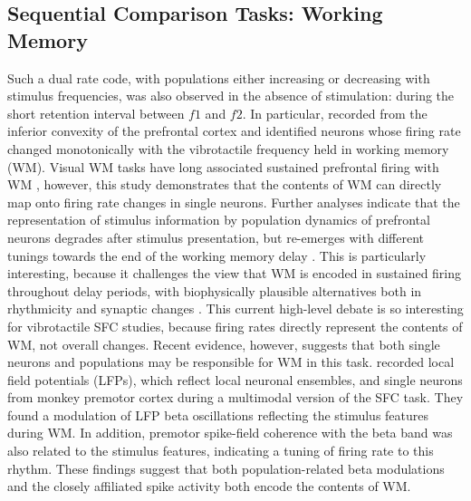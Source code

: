 \subsection{Sequential Comparison Tasks: Working Memory}
Such a dual rate code, with populations either increasing or decreasing with stimulus frequencies, was also observed in the absence of stimulation: during the short retention interval between $f1$ and $f2$. In particular, \textcite{Romo1999} recorded from the inferior convexity of the prefrontal cortex and identified neurons whose firing rate changed monotonically with the vibrotactile frequency held in working memory (WM). Visual WM tasks have long associated sustained prefrontal firing with WM \parencite{Funahashi1989,Fuster1971,Goldman-Rakic1995}, however, this study demonstrates that the contents of WM can directly map onto firing rate changes in single neurons. Further analyses indicate that the representation of stimulus information by population dynamics of prefrontal neurons degrades after stimulus presentation, but re-emerges with different tunings towards the end of the working memory delay \parencite{Barak2010}. This is particularly interesting, because it challenges the view that WM is encoded in sustained firing throughout delay periods, with biophysically plausible alternatives both in rhythmicity \parencite{Fiebig2017,Lundqvist2018a,Lundqvist2016} and synaptic changes \parencite{Mongillo2008,Stokes2015}. This current high-level debate \parencite[for either side, see:][]{Constantinidis2018,Lundqvist2018} is so interesting for vibrotactile SFC studies, because firing rates directly represent the contents of WM, not overall changes. Recent evidence, however, suggests that both single neurons and populations may be responsible for WM in this task. \textcite{Haegens2017} recorded local field potentials (LFPs), which reflect local neuronal ensembles, and single neurons from monkey premotor cortex during a multimodal version of the SFC task. They found a modulation of LFP beta oscillations reflecting the stimulus features during WM. In addition, premotor spike-field coherence with the beta band was also related to the stimulus features, indicating a tuning of firing rate to this rhythm. These findings suggest that both population-related beta modulations and the closely affiliated spike activity both encode the contents of WM.
